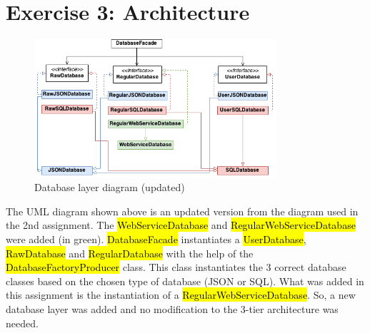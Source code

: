 \section{Exercise 3: Architecture}

\begin{figure}[h!]
    \caption{Database layer diagram (updated)}
    \centering
    \includegraphics[width=0.8\textwidth]{images/database.png}
\end{figure}

The UML diagram shown above is an updated version from the diagram used in the
2nd assignment. The \hl{WebServiceDatabase} and \hl{RegularWebServiceDatabase}
were added (in green). \hl{DatabaseFacade} instantiates a \hl{UserDatabase},
\hl{RawDatabase} and \hl{RegularDatabase} with the help of the
\hl{DatabaseFactoryProducer} class. This class instantiates the 3 correct
database classes based on the chosen type of database (JSON or SQL). What was
added in this assignment is the instantiation of a \hl{RegularWebServiceDatabase}.
So, a new database layer was added and no modification to the 3-tier architecture
was needed.

\newpage

